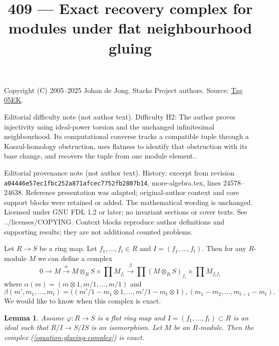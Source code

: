 \documentclass{amsart}
\theoremstyle{plain}
\newtheorem{lemma}[subsection]{Lemma}
\theoremstyle{definition}
\theoremstyle{remark}
\numberwithin{equation}{subsection}
\begin{document}
\title[Stacks Project, Tag 05EK]{409 --- Exact recovery complex for modules under flat neighbourhood gluing}
\maketitle
\noindent Copyright (C) 2005--2025 Johan de Jong. Stacks Project authors. Source: \href{https://stacks.math.columbia.edu/tag/05EK}{Tag 05EK}.

\noindent Editorial difficulty note (not author text). Difficulty H2: The author proves injectivity using ideal-power torsion and the unchanged infinitesimal neighbourhood. Its computational converse tracks a compatible tuple through a Koszul-homology obstruction, uses flatness to identify that obstruction with its base change, and recovers the tuple from one module element..

\noindent Editorial provenance note (not author text). History: excerpt from revision \texttt{a0444\allowbreak 6e57e\allowbreak c1fbc\allowbreak 252a8\allowbreak 71afc\allowbreak ec775\allowbreak 2fb28\allowbreak 07b14}, more-algebra.tex, lines 24578--24638. Reference presentation was adapted; original-author context and core support blocks were retained or added. The mathematical wording is unchanged. Licensed under GNU FDL 1.2 or later; no invariant sections or cover texts. See ../licenses/COPYING. Context blocks reproduce author definitions and supporting results; they are not additional counted problems.

Let $R \to S$ be a ring map.
Let $f_1, \ldots, f_t \in R$ and $I = (f_1, \ldots, f_t)$.
Then for any $R$-module $M$ we can define a complex
\begin{equation}
\label{equation-glueing-complex}
0 \to M \xrightarrow{\alpha}
M \otimes_R S \times \prod M_{f_i} \xrightarrow{\beta}
\prod (M \otimes_R S)_{f_i}
\times
\prod M_{f_if_j}
\end{equation}
where $\alpha(m) = (m \otimes 1, m/1, \ldots, m/1)$ and
$$
\beta(m', m_1, \ldots, m_t) =
((m'/1 - m_1 \otimes 1, \ldots, m'/1 - m_t \otimes 1),
(m_1 - m_2, \ldots, m_{t - 1} - m_t).
$$
We would like to know when this complex is exact.


\begin{lemma}
\label{lemma-recover-module-from-glueing-data}
Assume $\varphi : R \to S$ is a flat ring map and
$I = (f_1, \ldots, f_t) \subset R$ is an ideal such that
$R/I \to S/IS$ is an isomorphism.
Let $M$ be an $R$-module. Then the
complex (\ref{equation-glueing-complex})
is exact.
\end{lemma}
\end{document}
